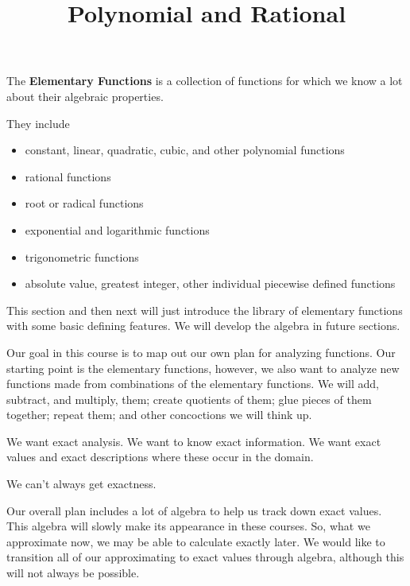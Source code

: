 \documentclass{ximera}
\title{Polynomial and Rational}
\begin{document}
\begin{abstract}
\end{abstract}
\maketitle




The \textbf{Elementary Functions} is a collection of functions for which we know a lot about their algebraic properties.

They include 

\begin{itemize}
\item constant, linear, quadratic, cubic, and other polynomial functions
\item rational functions
\item root or radical functions
\item exponential and logarithmic functions
\item trigonometric functions
\item absolute value, greatest integer, other individual piecewise defined functions
\end{itemize}



This section and then next will just introduce the library of elementary functions with some basic defining features.  We will develop the algebra in future sections.







Our goal in this course is to map out our own plan for analyzing functions.  Our starting point is the elementary functions, however, we also want to analyze new functions made from combinations of the elementary functions.  We will add, subtract, and multiply, them; create quotients of them; glue pieces of them together; repeat them; and other concoctions we will think up.

We want exact analysis.  We want to know exact information.  We want exact values and exact descriptions where these occur in the domain.

We can't always get exactness. 

Our overall plan includes a lot of algebra to help us track down exact values.  This algebra will slowly make its appearance in these courses.  So, what we approximate now, we may be able to calculate exactly later.  We would like to transition all of our approximating to exact values through algebra, although this will not always be possible.
\end{document}
